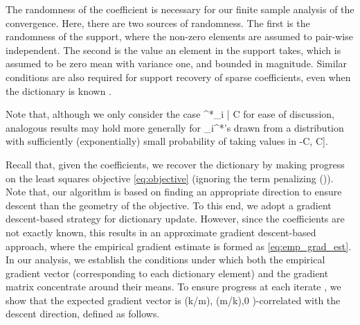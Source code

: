 \documentclass{article}
\def\[#1\]{{$#1$}}
\def\b#1{{\mathbf{#1}}}
\begin{document}
The randomness of the coefficient is necessary for our finite sample analysis of the convergence. Here, there are two sources of randomness. The first is the randomness of the support, where the non-zero elements are assumed to pair-wise independent. The second is the value an element in the support takes, which is assumed to be zero mean with variance one, and bounded in magnitude. Similar conditions are also required for support recovery of sparse coefficients, even when the dictionary is known \citep{Wainwright2009, Yuan2016}.

 
Note that, although we only consider the case \[|\b{x}^*_i | \geq C\] for ease of discussion, analogous results may hold more generally for \[\b{x}_i^*\]’s drawn from a distribution with sufficiently (exponentially) small probability of taking values in \[[-C, C]\].



Recall that, given the coefficients, we recover the dictionary by making progress on the least squares objective \eqref{eq:objective} (ignoring the term penalizing \[S(\cdot)\]). Note that, our algorithm is based on finding an appropriate direction to ensure descent than the geometry of the objective. To this end, we adopt a gradient descent-based strategy for dictionary update. However, since the coefficients are not exactly known, this results in an approximate gradient descent-based approach, where the empirical
gradient estimate is formed as \eqref{eq:emp_grad_est}. In our analysis, we establish the conditions under which both the empirical gradient vector (corresponding to each dictionary element) and the gradient matrix concentrate around their means. To ensure progress at each iterate \[t\], we show that the expected gradient vector is \[(\Omega(k/m), \Omega(m/k),0 )\]-correlated with the descent direction, defined as follows.
\end{document}
